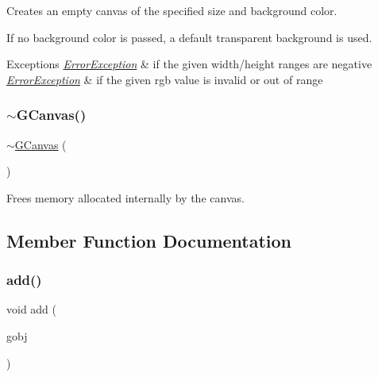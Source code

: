 Creates an empty canvas of the specified size and background color. 

If no background color is passed, a default transparent background is used. 
\begin{DoxyExceptions}{Exceptions}
{\em \mbox{\hyperlink{classErrorException}{Error\+Exception}}} & if the given width/height ranges are negative \\
\hline
{\em \mbox{\hyperlink{classErrorException}{Error\+Exception}}} & if the given rgb value is invalid or out of range \\
\hline
\end{DoxyExceptions}
\mbox{\label{classGCanvas_a601cc120704b2d2e9898a61f6ce94bc0}} 
\subsubsection{\texorpdfstring{$\sim$\+G\+Canvas()}{~GCanvas()}}
{\footnotesize\ttfamily $\sim$\mbox{\hyperlink{classGCanvas}{G\+Canvas}} (\begin{DoxyParamCaption}{ }\end{DoxyParamCaption})\hspace{0.3cm}{\ttfamily [virtual]}}



Frees memory allocated internally by the canvas. 



\subsection{Member Function Documentation}
\mbox{\label{classGCanvas_afe8277e7b2627513c6f7452fb0b2847d}} 
\subsubsection{\texorpdfstring{add()}{add()}\hspace{0.1cm}{\footnotesize\ttfamily [1/4]}}
{\footnotesize\ttfamily void add (\begin{DoxyParamCaption}\item[{\mbox{\hyperlink{classGObject}{G\+Object}} $\ast$}]{gobj }\end{DoxyParamCaption})\hspace{0.3cm}{\ttfamily [virtual]}}



